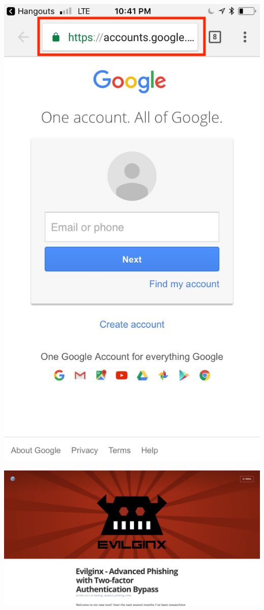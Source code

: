\documentclass[nobackground,dvipsnames,table]{beamer}
\begin{document}
\begin{frame}{}%
    \thispagestyle{empty}
    \includegraphics[height=\paperheight]{bad-link-mobile}
\end{frame}

\begin{frame}{}%
    \thispagestyle{empty}
    \includegraphics[width=\paperwidth]{evilginx}
\end{frame}
\end{document}
